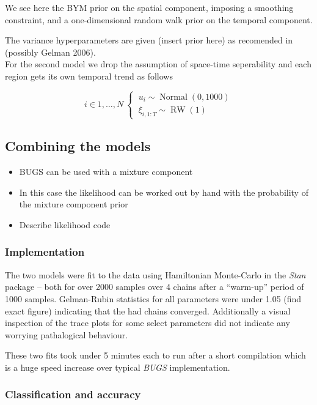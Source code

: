 \documentclass{report}
\begin{document}
We see here the BYM prior on the spatial component, imposing a smoothing constraint, and a one-dimensional random walk prior on the temporal component. 

The variance hyperparameters are given (insert prior here) as recomended in (possibly Gelman 2006). \\

For the second model we drop the assumption of space-time seperability and each region gets its own temporal trend as follows

\begin{equation}
i \in 1,\ldots,N \
\begin{cases}
\ u_i \sim \operatorname{Normal}(0, 1000) \\
\ \xi_{i, 1:T} \sim \operatorname{RW}(1) 
\end{cases}
\end{equation}

\subsection{Combining the models}

\begin{itemize}
\item BUGS can be used with a mixture component
\item In this case the likelihood can be worked out by hand with the probability of the mixture component prior
\item Describe likelihood code
\end{itemize}

\subsubsection{Implementation}

The two models were fit to the data using Hamiltonian Monte-Carlo in the \emph{Stan} package -- both for over 2000 samples over 4 chains after a ``warm-up'' period of 1000 samples. Gelman-Rubin statistics for all parameters were under 1.05 (find exact figure) indicating that the had chains converged. Additionally a visual inspection of the trace plots for some select parameters did not indicate any worrying pathalogical behaviour.

These two fits took under 5 minutes each to run after a short compilation which is a huge speed increase over typical \emph{BUGS} implementation.

\subsubsection{Classification and accuracy}
\end{document}
